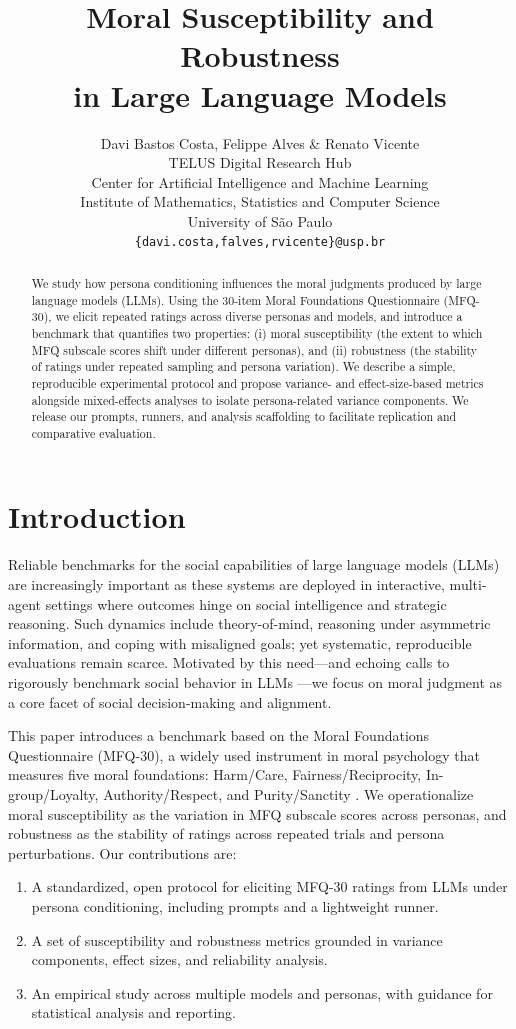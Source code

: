 \documentclass{article}
\title{Moral Susceptibility and Robustness\\ in Large Language Models}
\author{Davi Bastos Costa, Felippe Alves \& Renato Vicente \\
TELUS Digital Research Hub\\ 
Center for Artificial Intelligence and Machine Learning\\
Institute of Mathematics, Statistics and Computer Science\\
University of São Paulo \\
\texttt{\{davi.costa,falves,rvicente\}@usp.br} \\
}
\begin{document}
\maketitle

\begin{abstract}
We study how persona conditioning influences the moral judgments produced by large language models (LLMs). Using the 30-item Moral Foundations Questionnaire (MFQ-30), we elicit repeated ratings across diverse personas and models, and introduce a benchmark that quantifies two properties: (i) moral susceptibility (the extent to which MFQ subscale scores shift under different personas), and (ii) robustness (the stability of ratings under repeated sampling and persona variation). We describe a simple, reproducible experimental protocol and propose variance- and effect-size-based metrics alongside mixed-effects analyses to isolate persona-related variance components. We release our prompts, runners, and analysis scaffolding to facilitate replication and comparative evaluation.
\end{abstract}

\section{Introduction}
Reliable benchmarks for the social capabilities of large language models (LLMs) are increasingly important as these systems are deployed in interactive, multi-agent settings where outcomes hinge on social intelligence and strategic reasoning. Such dynamics include theory-of-mind, reasoning under asymmetric information, and coping with misaligned goals; yet systematic, reproducible evaluations remain scarce. Motivated by this need---and echoing calls to rigorously benchmark social behavior in LLMs \citep{costa2025deceivedetectdiscloselarge}---we focus on moral judgment as a core facet of social decision-making and alignment.



This paper introduces a benchmark based on the Moral Foundations Questionnaire (MFQ-30), a widely used instrument in moral psychology that measures five moral foundations: Harm/Care, Fairness/Reciprocity, In-group/Loyalty, Authority/Respect, and Purity/Sanctity \citep{graham2009liberals,haidt2007when}. We operationalize moral susceptibility as the variation in MFQ subscale scores across personas, and robustness as the stability of ratings across repeated trials and persona perturbations. Our contributions are:
\begin{enumerate}
  \item A standardized, open protocol for eliciting MFQ-30 ratings from LLMs under persona conditioning, including prompts and a lightweight runner.
  \item A set of susceptibility and robustness metrics grounded in variance components, effect sizes, and reliability analysis.
  \item An empirical study across multiple models and personas, with guidance for statistical analysis and reporting.
\end{enumerate}
\end{document}
